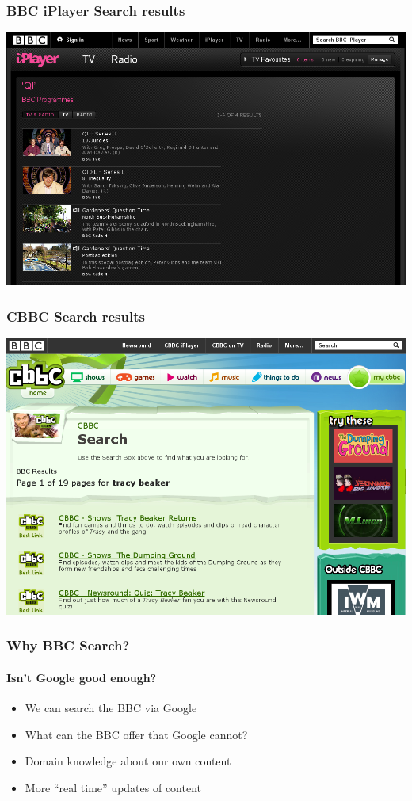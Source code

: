 \documentclass{beamer}
\begin{document}
\begin{frame}
  \frametitle{BBC iPlayer Search results}
  \includegraphics[width=\linewidth]{iplayer.png}
\end{frame}

\begin{frame}
  \frametitle{CBBC Search results}
  \includegraphics[width=\linewidth]{cbbc.png}
\end{frame}

\begin{frame}
  \frametitle{Why BBC Search?}
  \framesubtitle{Isn't Google good enough?}
  \begin{itemize}
    \pause \item We can search the BBC via Google
    \pause \item What can the BBC offer that Google cannot?
    \pause \item Domain knowledge about our own content
    \pause \item More ``real time'' updates of content
  \end{itemize}
\end{frame}
\end{document}
